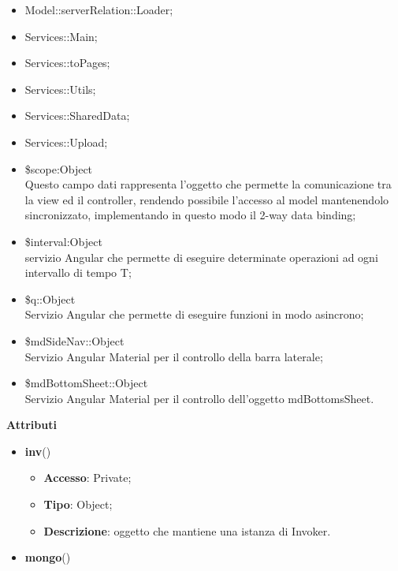 {{\begin{itemize}
\begin{itemize}
				\item ConcretePortaAvantiCommand;
				\item ConcretePortaDietroCommand;
				\item ConcreteAddToMainPathCommand;
				\item ConcreteRemoveFromMainPathCommand
			\end{itemize}
			\item Model::\-serverRelation::\-Loader;
			\item Services::\-Main;
			\item Services::\-toPages;
			\item Services::\-Utils;
			\item Services::\-SharedData;
			\item Services::\-Upload;
			\item \$scope:Object\\
				\indent Questo campo dati rappresenta l’oggetto che permette la comunicazione tra la view ed il controller, rendendo possibile l’accesso al model mantenendolo sincronizzato, implementando in questo modo il 2-way data binding;
			\item \$interval:Object\\
				\indent servizio Angular che permette di eseguire determinate operazioni ad ogni intervallo di tempo T;
			\item \$q::\-Object\\
				\indent Servizio Angular che permette di eseguire funzioni in modo asincrono;
			\item \$mdSideNav::\-Object\\
				\indent Servizio Angular Material per il controllo della barra laterale;
			\item \$mdBottomSheet::\-Object\\
				\indent Servizio Angular Material per il controllo dell'oggetto mdBottomsSheet.
		\end{itemize}
		\textbf{Attributi}\\
		\begin{itemize}
			\item \textbf{inv}()
			\begin{itemize}
				\item \textbf{Accesso}: Private;
				\item \textbf{Tipo}: Object;
				\item \textbf{Descrizione}: oggetto che mantiene una istanza di Invoker.
			\end{itemize}
			\item \textbf{mongo}()

\end{itemize}}}
